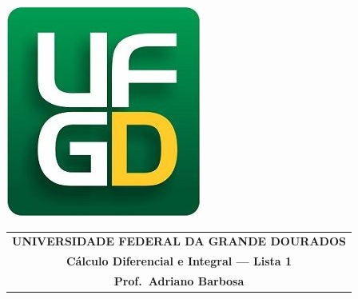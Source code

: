 \documentclass[a4paper]{article}
\begin{document}
%
%
\thispagestyle{empty}
\pagestyle{empty}
\begin{minipage}[h]{0.14\textwidth}
	\includegraphics[scale=0.24]{../../ufgd.png}
\end{minipage}
\begin{minipage}[h]{\textwidth}
    \begin{tabular}{c}
        {{\bf UNIVERSIDADE FEDERAL DA GRANDE DOURADOS}}\\
        {{\bf C\'alculo Diferencial e Integral --- Lista 1}}\\
        {{\bf Prof.\ Adriano Barbosa}}\\
    \end{tabular}
    \vspace{-0.45cm}
\end{minipage}

\vspace{1cm}
\end{document}
